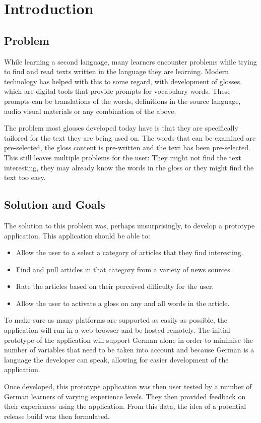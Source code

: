 \chapter{Introduction}

\section{Problem}
While learning a second language, many learners encounter problems while trying to find and read texts written in the language they are learning. Modern technology has helped with this to some regard, with development of glosses, which are digital tools that provide prompts for vocabulary words. These prompts can be translations of the words, definitions in the source language, audio visual materials or any combination of the above. 

The problem most glosses developed today have is that they are specifically tailored for the text they are being used on. The words that can be examined are pre-selected, the gloss content is pre-written and the text has been pre-selected. This still leaves multiple problems for the user: They might not find the text interesting, they may already know the words in the gloss or they might find the text too easy. 

\section{Solution and Goals}

The solution to this problem was, perhaps unsurprisingly, to develop a prototype application. This application should be able to:

\begin{itemize}
	\item Allow the user to a select a category of articles that they find interesting.
	
	\item Find and pull articles in that category from a variety of news sources.
	
	\item Rate the articles based on their perceived difficulty for the user.
	
	\item Allow the user to activate a gloss on any and all words in the article. 
\end{itemize}

To make sure as many platforms are supported as easily as possible, the application will run in a web browser and be hosted remotely. The initial prototype of the application will support German alone in order to minimise the number of variables that need to be taken into account and because German is a language the developer can speak, allowing for easier development of the application.

Once developed, this  prototype application was then user tested by a number of German learners of varying experience levels. They then provided feedback on their experiences using the application. From this data, the idea of a potential release build was then formulated. 